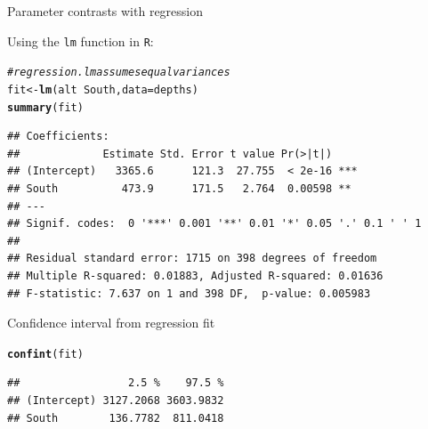 \documentclass[10pt,handout]{beamer}\usepackage[]{graphicx}\usepackage[]{color}
\makeatletter
\newcommand{\hlcom}[1]{\textcolor[rgb]{0.678,0.584,0.686}{\textit{#1}}}%
\newcommand{\hlopt}[1]{\textcolor[rgb]{0,0,0}{#1}}%
\newcommand{\hlstd}[1]{\textcolor[rgb]{0.345,0.345,0.345}{#1}}%
\newcommand{\hlkwb}[1]{\textcolor[rgb]{0.69,0.353,0.396}{#1}}%
\newcommand{\hlkwc}[1]{\textcolor[rgb]{0.333,0.667,0.333}{#1}}%
\newcommand{\hlkwd}[1]{\textcolor[rgb]{0.737,0.353,0.396}{\textbf{#1}}}%
\newenvironment{kframe}{%
 \def\at@end@of@kframe{}%
 \ifinner\ifhmode%
  \def\at@end@of@kframe{\end{minipage}}%
  \begin{minipage}{\columnwidth}%
 \fi\fi%
 \def\FrameCommand##1{\hskip\@totalleftmargin \hskip-\fboxsep
 \colorbox{shadecolor}{##1}\hskip-\fboxsep
     \hskip-\linewidth \hskip-\@totalleftmargin \hskip\columnwidth}%
 \MakeFramed {\advance\hsize-\width
   \@totalleftmargin\z@ \linewidth\hsize
   \@setminipage}}%
 {\par\unskip\endMakeFramed%
 \at@end@of@kframe}
\newenvironment{knitrout}{}{} %
\makeatother
\begin{document}
\begin{frame}[fragile]{Parameter contrasts with regression}
	
	Using the \texttt{lm} function in \texttt{R}:
	
	
\begin{knitrout}\scriptsize
{}\color{fgcolor}\begin{kframe}
\begin{alltt}
\hlcom{# regression. lm assumes equal variances}
\hlstd{fit} \hlkwb{<-} \hlkwd{lm}\hlstd{(alt} \hlopt{~} \hlstd{South,} \hlkwc{data} \hlstd{= depths)}
\hlkwd{summary}\hlstd{(fit)}
\end{alltt}
\begin{verbatim}
## Coefficients:
##             Estimate Std. Error t value Pr(>|t|)    
## (Intercept)   3365.6      121.3  27.755  < 2e-16 ***
## South          473.9      171.5   2.764  0.00598 ** 
## ---
## Signif. codes:  0 '***' 0.001 '**' 0.01 '*' 0.05 '.' 0.1 ' ' 1
## 
## Residual standard error: 1715 on 398 degrees of freedom
## Multiple R-squared: 0.01883,	Adjusted R-squared: 0.01636 
## F-statistic: 7.637 on 1 and 398 DF,  p-value: 0.005983
\end{verbatim}
\end{kframe}
\end{knitrout}
	
	
\end{frame}


\begin{frame}[fragile]{Confidence interval from regression fit}
	
\begin{knitrout}\scriptsize
{}\color{fgcolor}\begin{kframe}
\begin{alltt}
\hlkwd{confint}\hlstd{(fit)}
\end{alltt}
\begin{verbatim}
##                 2.5 %    97.5 %
## (Intercept) 3127.2068 3603.9832
## South        136.7782  811.0418
\end{verbatim}
\end{kframe}
\end{knitrout}
	
	
\end{frame}
\end{document}
